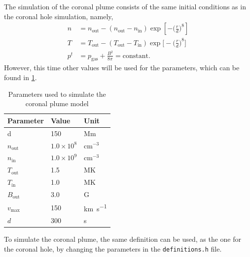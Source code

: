 \documentclass[a4paper]{article}
\numberwithin{figure}{section}
\numberwithin{equation}{section}
\begin{document}
The simulation of the coronal plume consists of the same initial conditions as in the coronal hole simulation, namely,
\begin{align*}
    n &= n_{\text{out}} - (n_{\text{out}}-n_{\text{in}})\exp\left[-\bigg(\frac{r}{d}\bigg)^8\right]\\
    T &= T_{\text{out}} - (T_{\text{out}}-T_{\text{in}})\exp\bigg[-\bigg(\frac{r}{d}\bigg)^8\bigg]\\
     p^t &= p_{\text{gas}} + \frac{B^2}{8\pi} = \text{constant}.
\end{align*}
However, this time other values will be used for the parameters, which can be found in \cref{tab:coronal_plume}. 
\begin{table}[H]
    \centering
    \caption{Parameters used to simulate the coronal plume model}
    \label{tab:coronal_plume}
    \begin{tabular}{|l|l|l|}
    \hline
    \textbf{Parameter}             & \textbf{Value}                                  & \textbf{Unit}              \\ \hline
    d                              & 150                                             & Mm                         \\ \hline
    $n_\text{out}$ & $1.0 \times 10^8$ & $\text{cm}^{-3}$ \\ \hline
    $n_\text{in}$                              & $1.0 \times 10^9$                                               & $\text{cm}^{-3}$                          \\ \hline
    $T_\text{out}$                              & 1.5                                               & MK                          \\ \hline
    $T_\text{in}$                              & 1.0                                               & MK                          \\ \hline
    $B_\text{out}$                              & 3.0                                               & G                          \\ \hline
    $v_\text{max}$ 			 	& 150						& \si{\kilo\metre \per \second}  \\ \hline
    $d$						& 300						& \si{\second} \\ \hline
\end{tabular}
\end{table}
To simulate the coronal plume, the same definition can be used, as the one for the coronal hole, by changing the parameters in the \texttt{definitions.h} file.\\
\end{document}
